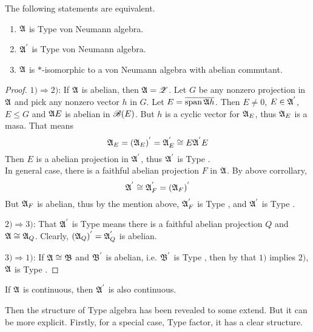 \begin{thm}
	The following statements are equivalent.
	\begin{enumerate}[label=\arabic*)]
		\item $\mathfrak{A}$ is Type  von Neumann algebra.
		\item $\mathfrak{A}^{'}$ is Type  von Neumann algebra.
		\item $\mathfrak{A}$ is $*$-isomorphic to a von Neumann algebra with abelian commutant.
	\end{enumerate}
\end{thm}
\begin{proof}
	$1) \Rightarrow 2)$: If $\mathfrak{A}$ is abelian, then $\mathfrak{A} = \mathscr{Z}$. Let $G$ be any nonzero projection in $\mathfrak{A}$ and pick any nonzero vector $h$ in $G$. Let $E = \overline{\operatorname{span}{\mathfrak{A} h}}$. Then $E \neq 0$, $E \in \mathfrak{A}^{'}$, $E \leqslant G$ and $\mathfrak{A} E$ is abelian in $\mathscr{B}(E)$. But $h$ is a cyclic vector for $\mathfrak{A}_E$, thus $\mathfrak{A}_E$ is a masa. That means
	\begin{equation*}
		\mathfrak{A}_E = (\mathfrak{A}_E)^{'} = \mathfrak{A}_E^{'} \cong E\mathfrak{A}^{'}E
	\end{equation*}
	Then $E$ is a abelian projection in $\mathfrak{A}^{'}$, thus $\mathfrak{A}^{'}$ is Type .\\
	In general case, there is a faithful abelian projection $F$ in $\mathfrak{A}$. By above corrollary,
	\begin{equation*}
		\mathfrak{A}^{'} \cong \mathfrak{A}^{'}_F = (\mathfrak{A}_F)^{'}
	\end{equation*}
	But $\mathfrak{A}_F$ is abelian, thus by the mention above, $\mathfrak{A}^{'}_F$ is Type , and $\mathfrak{A}^{'}$ is Type .
	\item $2) \Rightarrow 3)$: That $\mathfrak{A}^{'}$ is Type  means there is a faithful abelian projection $Q$ and $\mathfrak{A} \cong \mathfrak{A}_Q$. Clearly, $(\mathfrak{A}_Q)^{'} = \mathfrak{A}^{'}_Q$ is abelian.
	\item $3) \Rightarrow 1)$: If $\mathfrak{A} \cong \mathfrak{B}$ and $\mathfrak{B}^{'}$ is abelian, i.e. $\mathfrak{B}^{'}$ is Type , then by that $1)$ implies $2)$, $\mathfrak{A}$ is Type .
\end{proof}

\begin{cor}
	If $\mathfrak{A}$ is continuous, then $\mathfrak{A}^{'}$ is also continuous.
\end{cor}

Then the structure of Type  algebra has been revealed to some extend. But it can be more explicit. Firstly, for a special case, Type  factor, it has a clear structure.

